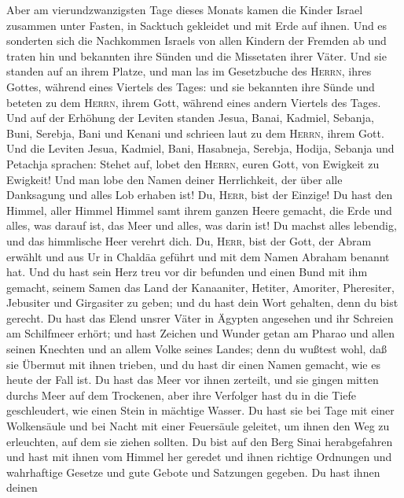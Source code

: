  Aber am vierundzwanzigsten Tage dieses Monats kamen die
Kinder Israel zusammen unter Fasten, in Sacktuch gekleidet und mit Erde
auf ihnen.  Und es sonderten sich die Nachkommen Israels
von allen Kindern der Fremden ab und traten hin und bekannten ihre
Sünden und die Missetaten ihrer Väter.  Und sie standen
auf an ihrem Platze, und man las im Gesetzbuche des \textsc{Herrn},
ihres Gottes, während eines Viertels des Tages: und sie bekannten ihre
Sünde und beteten zu dem \textsc{Herrn}, ihrem Gott, während eines
andern Viertels des Tages.  Und auf der Erhöhung der
Leviten standen Jesua, Banai, Kadmiel, Sebanja, Buni, Serebja, Bani und
Kenani und schrieen laut zu dem \textsc{Herrn}, ihrem Gott.
 Und die Leviten Jesua, Kadmiel, Bani, Hasabneja, Serebja,
Hodija, Sebanja und Petachja sprachen: Stehet auf, lobet den
\textsc{Herrn}, euren Gott, von Ewigkeit zu Ewigkeit! Und man lobe den
Namen deiner Herrlichkeit, der über alle Danksagung und alles Lob
erhaben ist!  Du, \textsc{Herr}, bist der Einzige! Du hast
den Himmel, aller Himmel Himmel samt ihrem ganzen Heere gemacht, die
Erde und alles, was darauf ist, das Meer und alles, was darin ist! Du
machst alles lebendig, und das himmlische Heer verehrt dich.
 Du, \textsc{Herr}, bist der Gott, der Abram erwählt und
aus Ur in Chaldäa geführt und mit dem Namen Abraham benannt hat.
 Und du hast sein Herz treu vor dir befunden und einen
Bund mit ihm gemacht, seinem Samen das Land der Kanaaniter, Hetiter,
Amoriter, Pheresiter, Jebusiter und Girgasiter zu geben; und du hast
dein Wort gehalten, denn du bist gerecht.  Du hast das
Elend unsrer Väter in Ägypten angesehen und ihr Schreien am Schilfmeer
erhört;  und hast Zeichen und Wunder getan am Pharao und
allen seinen Knechten und an allem Volke seines Landes; denn du wußtest
wohl, daß sie Übermut mit ihnen trieben, und du hast dir einen Namen
gemacht, wie es heute der Fall ist.  Du hast das Meer vor
ihnen zerteilt, und sie gingen mitten durchs Meer auf dem Trockenen,
aber ihre Verfolger hast du in die Tiefe geschleudert, wie einen Stein
in mächtige Wasser.  Du hast sie bei Tage mit einer
Wolkensäule und bei Nacht mit einer Feuersäule geleitet, um ihnen den
Weg zu erleuchten, auf dem sie ziehen sollten.  Du bist
auf den Berg Sinai herabgefahren und hast mit ihnen vom Himmel her
geredet und ihnen richtige Ordnungen und wahrhaftige Gesetze und gute
Gebote und Satzungen gegeben.  Du hast ihnen deinen
